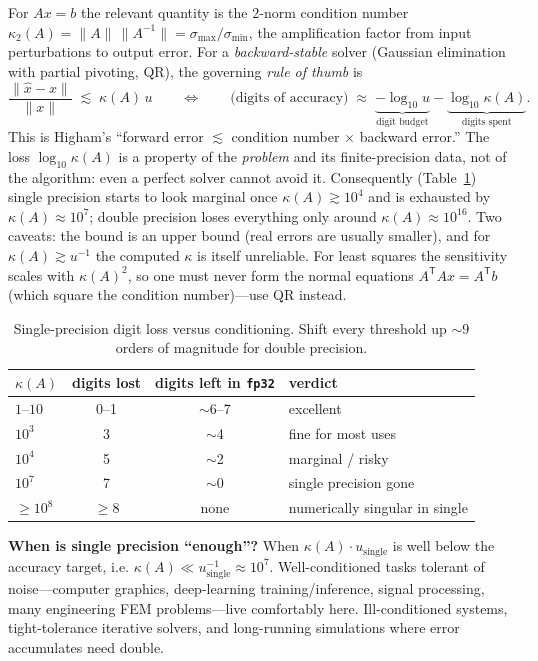 \documentclass[11pt]{article}
\begin{document}
For $Ax=b$ the relevant quantity is the $2$-norm condition number
$\kappa_2(A)=\|A\|\,\|A^{-1}\|=\sigma_{\max}/\sigma_{\min}$, the amplification factor
from input perturbations to output error. For a \emph{backward-stable} solver (Gaussian
elimination with partial pivoting, QR), the governing \emph{rule of thumb} is
\begin{equation}
\frac{\|\hat{x}-x\|}{\|x\|}\;\lesssim\;\kappa(A)\,u
\qquad\Longleftrightarrow\qquad
\text{(digits of accuracy)}\;\approx\;\underbrace{-\log_{10}u}_{\text{digit budget}}
-\underbrace{\log_{10}\kappa(A)}_{\text{digits spent}} .
\label{eq:rule}
\end{equation}
This is Higham's ``forward error $\lesssim$ condition number $\times$ backward error.''
The loss $\log_{10}\kappa(A)$ is a property of the \emph{problem} and its finite-precision
data, not of the algorithm: even a perfect solver cannot avoid it. Consequently
(Table~\ref{tab:thresh}) single precision starts to look marginal once
$\kappa(A)\gtrsim10^{4}$ and is exhausted by $\kappa(A)\approx10^{7}$; double precision
loses everything only around $\kappa(A)\approx10^{16}$. Two caveats: the bound is an
upper bound (real errors are usually smaller), and for $\kappa(A)\gtrsim u^{-1}$ the
computed $\kappa$ is itself unreliable. For least squares the sensitivity scales with
$\kappa(A)^2$, so one must never form the normal equations $A^{\mathsf T}Ax=A^{\mathsf T}b$
(which square the condition number)---use QR instead.

\begin{table}[h]
\centering\small
\begin{tabular}{lccl}
\toprule
$\kappa(A)$ & digits lost & digits left in \texttt{fp32} & verdict \\
\midrule
$1$--$10$ & 0--1 & $\sim$6--7 & excellent \\
$10^{3}$  & 3    & $\sim$4    & fine for most uses \\
$10^{4}$  & 5    & $\sim$2    & marginal / risky \\
$10^{7}$  & 7    & $\sim$0    & single precision gone \\
$\ge 10^{8}$ & $\ge 8$ & none & numerically singular in single \\
\bottomrule
\end{tabular}
\caption{Single-precision digit loss versus conditioning. Shift every threshold up
$\sim$9 orders of magnitude for double precision.}
\label{tab:thresh}
\end{table}\normalsize

\noindent\textbf{When is single precision ``enough''?} When
$\kappa(A)\cdot u_{\text{single}}$ is well below the accuracy target, i.e.
$\kappa(A)\ll u_{\text{single}}^{-1}\approx10^{7}$. Well-conditioned tasks tolerant of
noise---computer graphics, deep-learning training/inference, signal processing, many
engineering FEM problems---live comfortably here. Ill-conditioned systems, tight-tolerance
iterative solvers, and long-running simulations where error accumulates need double.
\end{document}
